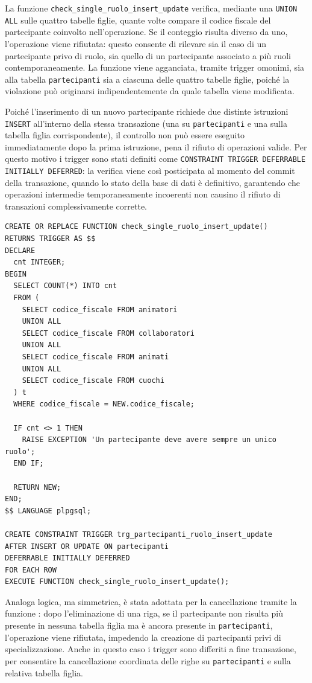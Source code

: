 \documentclass[11pt,a4paper]{article}
\begin{document}
La funzione \texttt{check\_single\_ruolo\_insert\_update} verifica, mediante una
\texttt{UNION ALL} sulle quattro tabelle figlie, quante volte compare il codice fiscale del
partecipante coinvolto nell'operazione. Se il conteggio risulta diverso da uno, l'operazione
viene rifiutata: questo consente di rilevare sia il caso di un partecipante privo di ruolo, sia
quello di un partecipante associato a più ruoli contemporaneamente. La funzione viene agganciata,
tramite trigger omonimi, sia alla tabella \texttt{partecipanti} sia a ciascuna delle quattro
tabelle figlie, poiché la violazione può originarsi indipendentemente da quale tabella viene
modificata.

Poiché l'inserimento di un nuovo partecipante richiede due distinte istruzioni \texttt{INSERT}
all'interno della stessa transazione (una su \texttt{partecipanti} e una sulla tabella figlia
corrispondente), il controllo non può essere eseguito immediatamente dopo la prima istruzione,
pena il rifiuto di operazioni valide. Per questo motivo i trigger sono stati definiti come
\texttt{CONSTRAINT TRIGGER DEFERRABLE INITIALLY DEFERRED}: la verifica viene così posticipata
al momento del commit della transazione, quando lo stato della base di dati è definitivo,
garantendo che operazioni intermedie temporaneamente incoerenti non causino il rifiuto di
transazioni complessivamente corrette.

\begin{verbatim}
CREATE OR REPLACE FUNCTION check_single_ruolo_insert_update()
RETURNS TRIGGER AS $$
DECLARE
  cnt INTEGER;
BEGIN
  SELECT COUNT(*) INTO cnt
  FROM (
    SELECT codice_fiscale FROM animatori
    UNION ALL
    SELECT codice_fiscale FROM collaboratori
    UNION ALL
    SELECT codice_fiscale FROM animati
    UNION ALL
    SELECT codice_fiscale FROM cuochi
  ) t
  WHERE codice_fiscale = NEW.codice_fiscale;

  IF cnt <> 1 THEN
    RAISE EXCEPTION 'Un partecipante deve avere sempre un unico ruolo';
  END IF;

  RETURN NEW;
END;
$$ LANGUAGE plpgsql;

CREATE CONSTRAINT TRIGGER trg_partecipanti_ruolo_insert_update
AFTER INSERT OR UPDATE ON partecipanti
DEFERRABLE INITIALLY DEFERRED
FOR EACH ROW
EXECUTE FUNCTION check_single_ruolo_insert_update();
\end{verbatim}

Analoga logica, ma simmetrica, è stata adottata per la cancellazione tramite la funzione
: dopo l'eliminazione di una riga, se il partecipante non
risulta più presente in nessuna tabella figlia ma è ancora presente in \texttt{partecipanti},
l'operazione viene rifiutata, impedendo la creazione di partecipanti privi di specializzazione.
Anche in questo caso i trigger sono differiti a fine transazione, per consentire la
cancellazione coordinata delle righe su \texttt{partecipanti} e sulla relativa tabella figlia.
\end{document}
